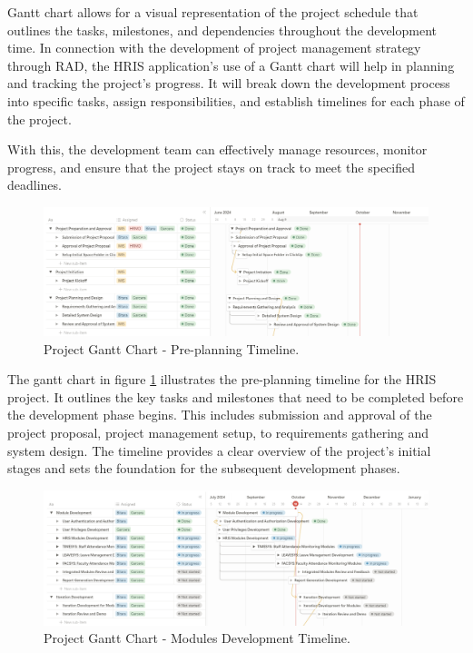     Gantt chart allows for a visual representation of the project schedule that outlines the tasks, milestones, and dependencies throughout the development time. In connection with the development of project management strategy through RAD, the HRIS application's use of a Gantt chart will help in planning and tracking the project's progress. It will break down the development process into specific tasks, assign responsibilities, and establish timelines for each phase of the project.
    
    With this, the development team can effectively manage resources, monitor progress, and ensure that the project stays on track to meet the specified deadlines.

    \begin{figure}[H]
        \centering
        \includegraphics[width=1\linewidth]{figures/images/diagrams/gantt/gantt-chart-1.png}
        \caption{Project Gantt Chart - Pre-planning Timeline.}
        \label{fig:gantt-chart-1}
    \end{figure}

    The gantt chart in figure \ref{fig:gantt-chart-1} illustrates the pre-planning timeline for the HRIS project. It outlines the key tasks and milestones that need to be completed before the development phase begins. This includes submission and approval of the project proposal, project management setup, to requirements gathering and system design. The timeline provides a clear overview of the project's initial stages and sets the foundation for the subsequent development phases.

    \begin{figure}[H]
        \centering
        \includegraphics[width=1\linewidth]{figures/images/diagrams/gantt/gantt-chart-2.png}
        \caption{Project Gantt Chart - Modules Development Timeline.}
        \label{fig:gantt-chart-2}
    \end{figure}

